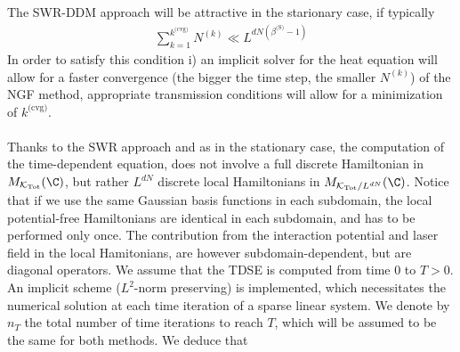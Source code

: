 The SWR-DDM approach will be attractive in the starionary case, if typically
\begin{eqnarray*}
\sum_{k=1}^{k^{\textrm{(cvg)}}} N^{(k)} \ll L^{dN(\beta^{\textrm{(S)}}-1)}
\end{eqnarray*}
In order to satisfy this condition i) an implicit solver for the heat equation will allow for a faster convergence (the bigger the time step, the smaller $N^{(k)}$) of the NGF method, appropriate transmission conditions will allow for a minimization of $k^{\textrm{(cvg)}}$.\\
\\
 Thanks to the SWR approach and as in the stationary case, the computation of the time-dependent equation, does not involve a full discrete Hamiltonian in $M_{\mathcal{K}_{\textrm{Tot}}}(\C)$, but rather $L^{dN}$ discrete local Hamiltonians in $M_{\mathcal{K}_{\textrm{Tot}}/L^{dN}}(\C)$. Notice that if we use the same Gaussian basis functions in each subdomain, the local potential-free Hamiltonians are identical in each subdomain, and has to be performed only once. The contribution from the interaction potential and laser field in the local Hamitonians, are however subdomain-dependent, but are diagonal operators. We assume that the TDSE is computed from time $0$ to $T>0$. An implicit scheme ($L^2$-norm preserving) is implemented, which necessitates the numerical solution at each time iteration of a sparse linear system. We denote by $n_T$ the total number of time iterations to reach $T$, which will be assumed to be the same for both methods. We deduce that

